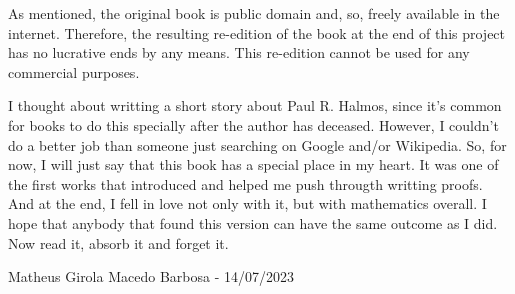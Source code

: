 As mentioned, the original book is public domain and, so, freely available in the internet. Therefore, the resulting re-edition of the book at the end of this project has no lucrative ends by any means. This re-edition cannot be used for any commercial purposes.

I thought about writting a short story about Paul R. Halmos, since it's common for books to do this specially after the author has deceased. However, I couldn't do a better job than someone just searching on Google and/or Wikipedia. So, for now, I will just say that this book has a special place in my heart. It was one of the first works that introduced and helped me push througth writting proofs. And at the end, I fell in love not only with it, but with mathematics overall. I hope that anybody that found this version can have the same outcome as I did. Now read it, absorb it and forget it.

\begin{flushright}
Matheus Girola Macedo Barbosa - 14/07/2023
\end{flushright}
